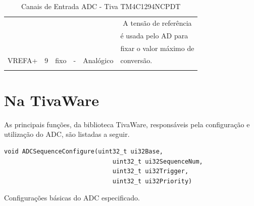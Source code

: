 \begin{center}
\begin{longtable}{|c|c|c|c|c|c|}
	\hline
	&                                &                                   &                             &                               & A tensão de referência                      \\
	&                                &                                   &                             &                               & \multicolumn{1}{l|}{é usada pelo AD para}    \\
	&                                &                                   &                             &                               & \multicolumn{1}{l|}{fixar o valor máximo de} \\
	\multirow{-4}{*}{VREFA+}    & \multirow{-4}{*}{9}            & \multirow{-4}{*}{fixo}            & \multirow{-4}{*}{-}         & \multirow{-4}{*}{Analógico}   & \multicolumn{1}{l|}{conversão.}  \\ 
	\hline
	\caption{Canais de Entrada ADC - Tiva TM4C1294NCPDT \cite{DATASHEET_TIVA} }
	\label{tab:CanaisADC}
\end{longtable}
\end{center}

\section{Na TivaWare}

As principais funções, da biblioteca TivaWare, responsáveis pela configuração e utilização do ADC, são listadas a seguir.

\begin{lstlisting}[style=funcao]
	void ADCSequenceConfigure(uint32_t ui32Base,
							  uint32_t ui32SequenceNum,
							  uint32_t ui32Trigger,
							  uint32_t ui32Priority)
\end{lstlisting}

Configurações básicas do ADC especificado.

